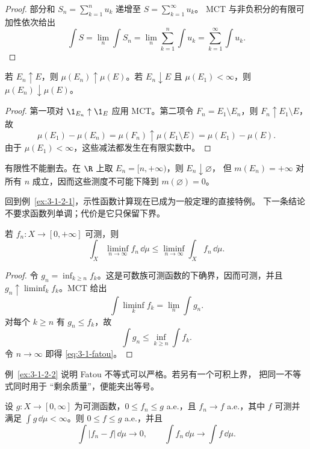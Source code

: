 \begin{proof}
部分和 $S_n=\sum_{k=1}^n u_k$ 递增至 $S=\sum_{k=1}^\infty u_k$。
MCT 与非负积分的有限可加性依次给出
\[
 \int S=\lim_n\int S_n
 =\lim_n\sum_{k=1}^n\int u_k
 =\sum_{k=1}^\infty\int u_k.
\]
\end{proof}

\begin{corollary}[集合的单调连续性]\label{corollary:3-1-2-set-continuity}
若 $E_n\uparrow E$，则 $\mu(E_n)\uparrow\mu(E)$。若 $E_n\downarrow E$ 且
$\mu(E_1)<\infty$，则 $\mu(E_n)\downarrow\mu(E)$。
\end{corollary}

\begin{proof}
第一项对 $\1_{E_n}\uparrow\1_E$ 应用 MCT。第二项令
$F_n=E_1\setminus E_n$，则 $F_n\uparrow E_1\setminus E$，故
\[
 \mu(E_1)-\mu(E_n)=\mu(F_n)\uparrow\mu(E_1\setminus E)=\mu(E_1)-\mu(E).
\]
由于 $\mu(E_1)<\infty$，这些减法都发生在有限实数中。
\end{proof}

有限性不能删去。在 $\R$ 上取 $E_n=[n,+\infty)$，则 $E_n\downarrow\varnothing$，
但 $m(E_n)=+\infty$ 对所有 $n$ 成立，因而这些测度不可能下降到 $m(\varnothing)=0$。

回到例~\ref{ex:3-1-2-1}，示性函数计算现在已成为一般定理的直接特例。
下一条结论不要求函数列单调；代价是它只保留下界。

\begin{theorem}[Fatou 引理]\label{theorem:3-1-2-2}
若 $f_n:X\to[0,+\infty]$ 可测，则
\[
 \int_X\liminf_{n\to\infty}f_n\,\dd\mu
 \leq\liminf_{n\to\infty}\int_Xf_n\,\dd\mu.
 \tag{3.1.11}\label{eq:3-1-fatou}
\]
\end{theorem}

\begin{proof}
令 $g_n=\inf_{k\geq n}f_k$。这是可数族可测函数的下确界，因而可测，并且
$g_n\uparrow\liminf_kf_k$。MCT 给出
\[
 \int\liminf_kf_k=\lim_n\int g_n.
\]
对每个 $k\geq n$ 有 $g_n\leq f_k$，故
\[
 \int g_n\leq\inf_{k\geq n}\int f_k.
\]
令 $n\to\infty$ 即得 \eqref{eq:3-1-fatou}。
\end{proof}

例~\ref{ex:3-1-2-2} 说明 Fatou 不等式可以严格。若另有一个可积上界，
把同一不等式同时用于 ``剩余质量''，便能夹出等号。

\begin{theorem}[非负支配收敛定理]\label{theorem:3-1-2-3}
设 $g:X\to[0,\infty]$ 为可测函数，$0\leq f_n\leq g$ a.e.，且
$f_n\to f$ a.e.，其中 $f$ 可测并满足 $\int g\,\dd\mu<\infty$。则
$0\leq f\leq g$ a.e.，并且
\[
 \int|f_n-f|\,\dd\mu\longrightarrow0,
 \qquad
 \int f_n\,\dd\mu\longrightarrow\int f\,\dd\mu.
 \tag{3.1.12}\label{eq:3-1-nonnegative-dct}
\]
\end{theorem}

